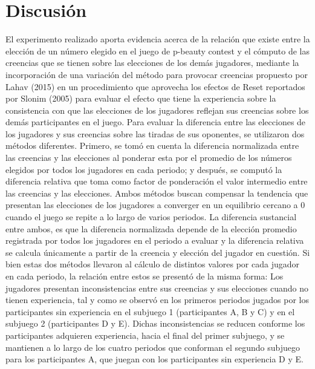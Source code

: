 
\chapter{Discusión} %

\label{Cap_Disc} %
El experimento realizado aporta evidencia acerca de la relación que existe entre la elección de un número elegido en el juego de p-beauty contest y el cómputo de las creencias que se tienen sobre las elecciones de los demás jugadores, mediante la incorporación de una variación del método para provocar creencias propuesto por Lahav (2015) en un procedimiento que aprovecha los efectos de Reset reportados por Slonim (2005) para evaluar el efecto que tiene la experiencia sobre la consistencia con que las elecciones de los jugadores reflejan sus creencias sobre los demás participantes en el juego.
Para evaluar la diferencia entre las elecciones de los jugadores y sus creencias sobre las tiradas de sus oponentes, se utilizaron dos métodos diferentes. Primero, se tomó en cuenta la diferencia normalizada entre las creencias y las elecciones al ponderar esta por el promedio de los números elegidos por todos los jugadores en cada periodo; y después, se computó la diferencia relativa que toma como factor de ponderación el valor intermedio entre las creencias y las elecciones. Ambos métodos buscan compensar la tendencia que presentan las elecciones de los jugadores a converger en un equilibrio cercano a 0 cuando el juego se repite a lo largo de varios periodos. La diferencia sustancial entre ambos, es que la diferencia normalizada depende de la elección promedio registrada por todos los jugadores en el periodo a evaluar y  la diferencia relativa se calcula únicamente a partir de la creencia y elección del jugador en cuestión.
Si bien estas dos métodos llevaron al cálculo de distintos valores por cada jugador en cada periodo,  la relación entre estos se presentó de la misma forma: Los jugadores presentan inconsistencias entre sus creencias y sus elecciones cuando no tienen experiencia, tal y como se observó en los primeros periodos jugados por los participantes sin experiencia en el subjuego 1 (participantes A, B y C)  y en  el subjuego 2 (participantes D y E). Dichas inconsistencias se reducen conforme los participantes adquieren experiencia, hacia el final del primer subjuego, y se mantienen a lo largo de los cuatro periodos que conforman el segundo subjuego para los participantes A, que juegan con los participantes sin experiencia D y E.

